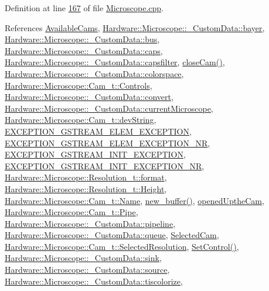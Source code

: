 Definition at line \hyperlink{_microscope_8cpp_source_l00167}{167} of file \hyperlink{_microscope_8cpp_source}{Microscope.\+cpp}.



References \hyperlink{_microscope_8h_source_l00148}{Available\+Cams}, \hyperlink{_microscope_8h_source_l00112}{Hardware\+::\+Microscope\+::\+\_\+\+Custom\+Data\+::bayer}, \hyperlink{_microscope_8h_source_l00117}{Hardware\+::\+Microscope\+::\+\_\+\+Custom\+Data\+::bus}, \hyperlink{_microscope_8h_source_l00118}{Hardware\+::\+Microscope\+::\+\_\+\+Custom\+Data\+::caps}, \hyperlink{_microscope_8h_source_l00109}{Hardware\+::\+Microscope\+::\+\_\+\+Custom\+Data\+::capsfilter}, \hyperlink{_microscope_8cpp_source_l00311}{close\+Cam()}, \hyperlink{_microscope_8h_source_l00114}{Hardware\+::\+Microscope\+::\+\_\+\+Custom\+Data\+::colorspace}, \hyperlink{_microscope_8h_source_l00129}{Hardware\+::\+Microscope\+::\+Cam\+\_\+t\+::\+Controls}, \hyperlink{_microscope_8h_source_l00115}{Hardware\+::\+Microscope\+::\+\_\+\+Custom\+Data\+::convert}, \hyperlink{_microscope_8h_source_l00119}{Hardware\+::\+Microscope\+::\+\_\+\+Custom\+Data\+::current\+Microscope}, \hyperlink{_microscope_8h_source_l00124}{Hardware\+::\+Microscope\+::\+Cam\+\_\+t\+::dev\+String}, \hyperlink{_microscope_not_found_exception_8h_source_l00021}{E\+X\+C\+E\+P\+T\+I\+O\+N\+\_\+\+G\+S\+T\+R\+E\+A\+M\+\_\+\+E\+L\+E\+M\+\_\+\+E\+X\+C\+E\+P\+T\+I\+O\+N}, \hyperlink{_microscope_not_found_exception_8h_source_l00022}{E\+X\+C\+E\+P\+T\+I\+O\+N\+\_\+\+G\+S\+T\+R\+E\+A\+M\+\_\+\+E\+L\+E\+M\+\_\+\+E\+X\+C\+E\+P\+T\+I\+O\+N\+\_\+\+N\+R}, \hyperlink{_microscope_not_found_exception_8h_source_l00019}{E\+X\+C\+E\+P\+T\+I\+O\+N\+\_\+\+G\+S\+T\+R\+E\+A\+M\+\_\+\+I\+N\+I\+T\+\_\+\+E\+X\+C\+E\+P\+T\+I\+O\+N}, \hyperlink{_microscope_not_found_exception_8h_source_l00020}{E\+X\+C\+E\+P\+T\+I\+O\+N\+\_\+\+G\+S\+T\+R\+E\+A\+M\+\_\+\+I\+N\+I\+T\+\_\+\+E\+X\+C\+E\+P\+T\+I\+O\+N\+\_\+\+N\+R}, \hyperlink{_microscope_8h_source_l00060}{Hardware\+::\+Microscope\+::\+Resolution\+\_\+t\+::format}, \hyperlink{_microscope_8h_source_l00059}{Hardware\+::\+Microscope\+::\+Resolution\+\_\+t\+::\+Height}, \hyperlink{_microscope_8h_source_l00123}{Hardware\+::\+Microscope\+::\+Cam\+\_\+t\+::\+Name}, \hyperlink{_microscope_8cpp_source_l00413}{new\+\_\+buffer()}, \hyperlink{_microscope_8h_source_l00188}{opened\+Upthe\+Cam}, \hyperlink{_microscope_8h_source_l00130}{Hardware\+::\+Microscope\+::\+Cam\+\_\+t\+::\+Pipe}, \hyperlink{_microscope_8h_source_l00107}{Hardware\+::\+Microscope\+::\+\_\+\+Custom\+Data\+::pipeline}, \hyperlink{_microscope_8h_source_l00113}{Hardware\+::\+Microscope\+::\+\_\+\+Custom\+Data\+::queue}, \hyperlink{_microscope_8h_source_l00149}{Selected\+Cam}, \hyperlink{_microscope_8h_source_l00128}{Hardware\+::\+Microscope\+::\+Cam\+\_\+t\+::\+Selected\+Resolution}, \hyperlink{_microscope_8cpp_source_l00374}{Set\+Control()}, \hyperlink{_microscope_8h_source_l00116}{Hardware\+::\+Microscope\+::\+\_\+\+Custom\+Data\+::sink}, \hyperlink{_microscope_8h_source_l00108}{Hardware\+::\+Microscope\+::\+\_\+\+Custom\+Data\+::source}, \hyperlink{_microscope_8h_source_l00111}{Hardware\+::\+Microscope\+::\+\_\+\+Custom\+Data\+::tiscolorize}, 